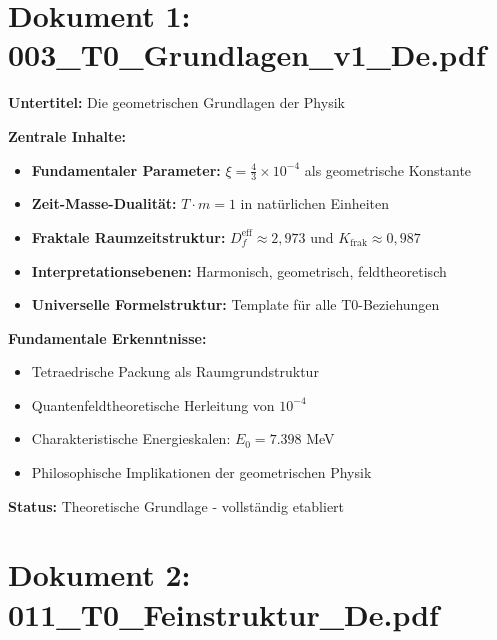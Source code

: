 	\section{Dokument 1: 003\_T0\_Grundlagen\_v1\_De.pdf}
	
	\begin{documentbox}
		\textbf{Untertitel:} Die geometrischen Grundlagen der Physik
		
		\textbf{Zentrale Inhalte:}
		\begin{itemize}
			\item \textbf{Fundamentaler Parameter:} $\xi = \frac{4}{3} \times 10^{-4}$ als geometrische Konstante
			\item \textbf{Zeit-Masse-Dualität:} $T \cdot m = 1$ in natürlichen Einheiten
			\item \textbf{Fraktale Raumzeitstruktur:} $D_f^{\text{eff}} \approx 2{,}973$ und $K_{\text{frak}} \approx 0{,}987$
			\item \textbf{Interpretationsebenen:} Harmonisch, geometrisch, feldtheoretisch
			\item \textbf{Universelle Formelstruktur:} Template für alle T0-Beziehungen
		\end{itemize}
		
		\textbf{Fundamentale Erkenntnisse:}
		\begin{itemize}
			\item Tetraedrische Packung als Raumgrundstruktur
			\item Quantenfeldtheoretische Herleitung von $10^{-4}$
			\item Charakteristische Energieskalen: $E_0 = 7.398$ MeV
			\item Philosophische Implikationen der geometrischen Physik
		\end{itemize}
		
		\textbf{Status:} Theoretische Grundlage - vollständig etabliert
	\end{documentbox}
	
	\section{Dokument 2: 011\_T0\_Feinstruktur\_De.pdf}
	
